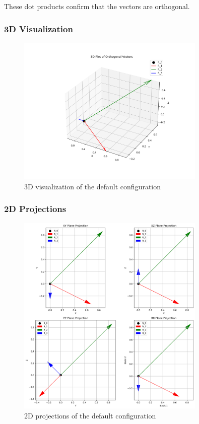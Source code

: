 These dot products confirm that the vectors are orthogonal.

\subsubsection{3D Visualization}

\begin{figure}[H]
    \centering
    \includegraphics[width=0.8\textwidth]{figures/default_3d.png}
    \caption{3D visualization of the default configuration}
    \label{fig:example_default_3d}
\end{figure}

\subsubsection{2D Projections}

\begin{figure}[H]
    \centering
    \includegraphics[width=0.8\textwidth]{figures/2d_projections.png}
    \caption{2D projections of the default configuration}
    \label{fig:example_default_2d}
\end{figure}

